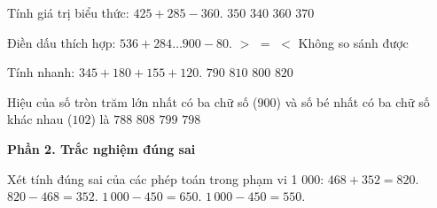\begin{ex} %
Tính giá trị biểu thức: $425 + 285 - 360$.
\choice
{\True $350$}
{$340$}
{$360$}
{$370$}
\end{ex}

\begin{ex} %
Điền dấu thích hợp: $536 + 284 \dots 900 - 80$.
\choice
{$>$}
{\True $=$}
{$<$}
{Không so sánh được}
\end{ex}

\begin{ex} %
Tính nhanh: $345 + 180 + 155 + 120$.
\choice
{$790$}
{$810$}
{\True $800$}
{$820$}
\end{ex}

\begin{ex} %
Hiệu của số tròn trăm lớn nhất có ba chữ số ($900$) và số bé nhất có ba chữ số khác nhau ($102$) là
\choice
{$788$}
{$808$}
{$799$}
{\True $798$}
\end{ex}

\textbf{Phần 2. Trắc nghiệm đúng sai}

\begin{ex} %
Xét tính đúng sai của các phép toán trong phạm vi 1 000:
\choiceTF
{\True $468 + 352 = 820$.}
{\True $820 - 468 = 352$.}
{$1\,000 - 450 = 650$.}
{\True $1\,000 - 450 = 550$.}
\end{ex}

